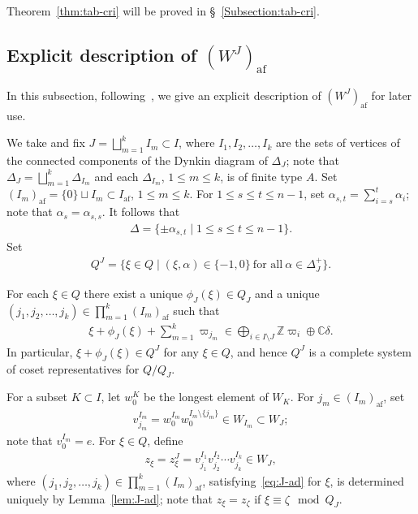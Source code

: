 \documentclass[ALCO,ThmDefs,Unicode,epreuves]{cedram}
\newcommand{\BC}{\mathbb{C}}
\newcommand{\BZ}{\mathbb{Z}}
\DeclareMathOperator{\af}{af}
\begin{document}
Theorem~\ref{thm:tab-cri} will be proved in \S~\ref{Subsection:tab-cri}.

\subsection{Explicit description of \texorpdfstring{$(W^J)_{\mathrm{af}}$}{(W J) af}}

In this subsection, 
following~\cite[\S~3]{LNSSS15}, 
we give an explicit description of 
$(W^J)_{\af}$ 
for later use. 

We take and fix $J = \bigsqcup_{m=1}^k I_m \subset I$, 
where $I_1 , I_2 , \ldots , I_k$ are the sets of vertices 
of the connected components of the Dynkin diagram of $\Delta_J$; 
note that 
$\Delta_J = \bigsqcup_{m=1}^k \Delta_{I_m}$ 
and each 
$\Delta_{I_m}$, $1 \leq m \leq k$, 
is of finite type $A$. 
Set 
$(I_m)_{\af} = \{ 0 \} \sqcup I_m \subset I_{\af}$, 
$1 \leq m \leq k$.
For $1 \leq s \leq t \leq n-1$, set 
$\alpha_{s,t} = \sum_{i=s}^t \alpha_i$; 
note that
$\alpha_s = \alpha_{s,s}$.
It follows that 
\begin{align} \label{eq:root-A}
\Delta = \{ \pm \alpha_{s,t} \mid 1 \leq s \leq t \leq n-1 \} .
\end{align}
Set 
\begin{align}
Q^J = \{ \xi \in Q \mid (\xi,\alpha) \in \{ -1,0\} \ \text{for all} \ \alpha \in \Delta_J^+ \} .
\end{align}

\begin{lemm} \label{lem:J-ad}
For each $\xi \in Q$ there exist a unique
$\phi_J(\xi) \in Q_J$ 
and a unique 
$(j_1, j_2 , \ldots , j_k) \in \prod_{m=1}^k (I_m)_{\af}$ 
such that 
\begin{align} \label{eq:J-ad}
\xi + \phi_J(\xi) + \sum_{m=1}^k \varpi_{j_m} \in \bigoplus_{i \in I \setminus J} \BZ \varpi_i \oplus \BC \delta.
\end{align}
In particular, $\xi + \phi_J(\xi) \in Q^J$ for any $\xi \in Q$, 
and hence $Q^J$ is a complete system of coset representatives for $Q/Q_J$. 
\end{lemm}

For a subset 
$K \subset I$, 
let 
$w_0^K$ 
be the longest element of 
$W_K$.
For $j_m \in (I_m)_{\af}$, set 
\begin{align}
v_{j_m}^{I_m} = w_0^{I_m} w_0^{I_m \setminus \{ j_m \}} \in W_{I_m} \subset W_J; 
\end{align}
note that $v^{I_m}_0 = e$.
For $\xi \in Q$, define
\begin{align} \label{eq:z}
z_{\xi} = z_{\xi}^J = v_{j_1}^{I_1} v_{j_2}^{I_2} \cdots v_{j_k}^{I_k} \in W_J,
\end{align}
where 
$(j_1, j_2 , \ldots , j_k) \in \prod_{m=1}^k (I_m)_{\af}$, 
satisfying~\eqref{eq:J-ad} for $\xi$, 
is determined uniquely by Lemma~\ref{lem:J-ad}; 
note that 
$z_{\xi} = z_{\zeta}$ 
if 
$\xi \equiv \zeta \mod Q_J$.
\end{document}
